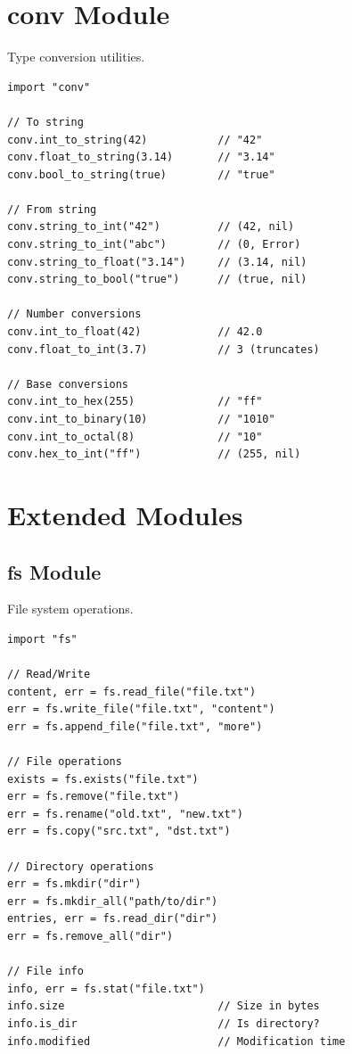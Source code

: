 \section{conv Module}

Type conversion utilities.

\begin{lstlisting}
import "conv"

// To string
conv.int_to_string(42)           // "42"
conv.float_to_string(3.14)       // "3.14"
conv.bool_to_string(true)        // "true"

// From string
conv.string_to_int("42")         // (42, nil)
conv.string_to_int("abc")        // (0, Error)
conv.string_to_float("3.14")     // (3.14, nil)
conv.string_to_bool("true")      // (true, nil)

// Number conversions
conv.int_to_float(42)            // 42.0
conv.float_to_int(3.7)           // 3 (truncates)

// Base conversions
conv.int_to_hex(255)             // "ff"
conv.int_to_binary(10)           // "1010"
conv.int_to_octal(8)             // "10"
conv.hex_to_int("ff")            // (255, nil)
\end{lstlisting}

\section{Extended Modules}

\subsection{fs Module}

File system operations.

\begin{lstlisting}
import "fs"

// Read/Write
content, err = fs.read_file("file.txt")
err = fs.write_file("file.txt", "content")
err = fs.append_file("file.txt", "more")

// File operations
exists = fs.exists("file.txt")
err = fs.remove("file.txt")
err = fs.rename("old.txt", "new.txt")
err = fs.copy("src.txt", "dst.txt")

// Directory operations
err = fs.mkdir("dir")
err = fs.mkdir_all("path/to/dir")
entries, err = fs.read_dir("dir")
err = fs.remove_all("dir")

// File info
info, err = fs.stat("file.txt")
info.size                        // Size in bytes
info.is_dir                      // Is directory?
info.modified                    // Modification time
\end{lstlisting}

